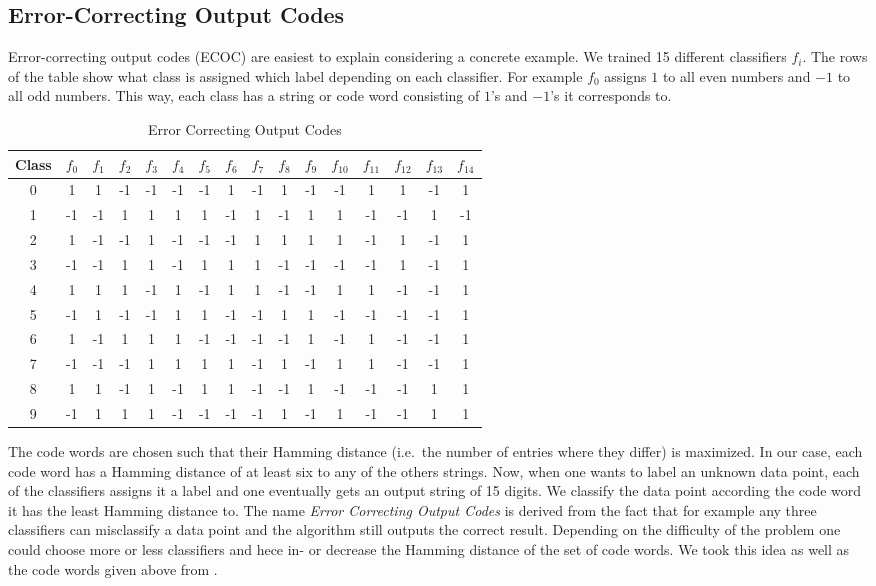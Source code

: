 \subsection{Error-Correcting Output Codes}
Error-correcting output codes (ECOC) are easiest to explain considering a concrete example. We trained 15 different classifiers $f_i$. The rows of the table show what class is assigned which label depending on each classifier. For example $f_0$ assigns $1$ to all even numbers and $-1$ to all odd numbers. This way, each class has a string or code word consisting of $1$'s and $-1$'s it corresponds to.

\begin{table}[ht!]
	\centering
	\caption{Error Correcting Output Codes}
	\label{Codewords}
	\begin{tabular}{|c|c|c|c|c|c|c|c|c|c|c|c|c|c|c|c|}
		\hline
		Class	& $f_0$ & $f_1$ & $f_2$ & $f_3$ & $f_4$ & $f_5$ & $f_6$ & $f_7$ & $f_8$ & $f_9$ & $f_{10}$ & $f_{11}$ & $f_{12}$ & $f_{13}$ & $f_{14}$ \\ \hline \hline
		0	& 1 & 1 & -1 & -1 & -1 & -1 & 1 & -1 & 1 & -1 & -1 & 1 & 1 & -1 & 1 \\ \hline
		1	& -1 & -1 & 1 & 1 & 1 & 1 & -1 & 1 & -1 & 1 & 1 & -1 & -1 & 1 & -1 \\ \hline
		2	& 1 & -1 & -1 & 1 & -1 & -1 & -1 & 1 & 1 & 1 & 1 & -1 & 1 & -1 & 1 \\ \hline
		3	& -1 & -1 & 1 & 1 & -1 & 1 & 1 & 1 & -1 & -1 & -1 & -1 & 1 & -1 & 1 \\ \hline
		4	& 1 & 1 & 1 & -1 & 1 & -1 & 1 & 1 & -1 & -1 & 1 & 1 & -1 & -1 & 1 \\ \hline
		5	& -1 & 1 & -1 & -1 & 1 & 1 & -1 & -1 & 1 & 1 & -1 & -1 & -1 & -1 & 1 \\ \hline
		6	& 1 & -1 & 1 & 1 & 1 & -1 & -1 & -1 & -1 & 1 & -1 & 1 & -1 & -1 & 1 \\ \hline
		7	& -1 & -1 & -1 & 1 & 1 & 1 & 1 & -1 & 1 & -1 & 1 & 1 & -1 & -1 & 1 \\ \hline
		8	& 1 & 1 & -1 & 1 & -1 & 1 & 1 & -1 & -1 & 1 & -1 & -1 & -1 & 1 & 1 \\ \hline
		9	& -1 & 1 & 1 & 1 & -1 & -1 & -1 & -1 & 1 & -1 & 1 & -1 & -1 & 1 & 1 \\ \hline
	\end{tabular}
\end{table}  

The code words are chosen such that their Hamming distance (i.e.\ the number of entries where they differ) is maximized. In our case, each code word has a Hamming distance of at least six to any of the others strings. Now, when one wants to label an unknown data point, each of the classifiers assigns it a label and one eventually gets an output string of 15 digits. We classify the data point according the code word it has the least Hamming distance to. The name \textit{Error Correcting Output Codes} is derived from the fact that for example any three classifiers can misclassify a data point and the algorithm still outputs the correct result. Depending on the difficulty of the problem one could choose more or less classifiers and hece in- or decrease the Hamming distance of the set of code words. We took this idea as well as the code words given above from \cite{dietterich1995solving}.


